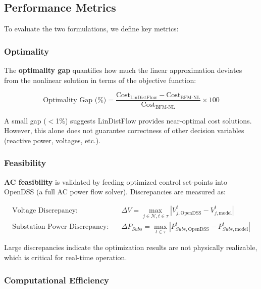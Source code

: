 \subsection{Performance Metrics}

To evaluate the two formulations, we define key metrics:

\subsubsection{Optimality}

The \textbf{optimality gap} quantifies how much the linear approximation deviates from the nonlinear solution in terms of the objective function:

\begin{equation}
    \text{Optimality Gap (\%)} = \frac{\text{Cost}_{\text{LinDistFlow}} - \text{Cost}_{\text{BFM-NL}}}{\text{Cost}_{\text{BFM-NL}}} \times 100
    \label{eq:mpopf-tradeoffs-opt-gap}
\end{equation}

A small gap ($<$1\%) suggests LinDistFlow provides near-optimal cost solutions. However, this alone does not guarantee correctness of other decision variables (reactive power, voltages, etc.).

\subsubsection{Feasibility}

\textbf{AC feasibility} is validated by feeding optimized control set-points into OpenDSS (a full AC power flow solver). Discrepancies are measured as:

\begin{align}
    \text{Voltage Discrepancy:} \quad &\Delta V = \max_{j \in \mathcal{N}, t \in \tau} |V^t_{j,\text{OpenDSS}} - V^t_{j,\text{model}}| \label{eq:mpopf-tradeoffs-feas-v} \\
    \text{Substation Power Discrepancy:} \quad &\Delta P_{Subs} = \max_{t \in \tau} |P^t_{Subs,\text{OpenDSS}} - P^t_{Subs,\text{model}}| \label{eq:mpopf-tradeoffs-feas-p}
\end{align}

Large discrepancies indicate the optimization results are not physically realizable, which is critical for real-time operation.

\subsubsection{Computational Efficiency}

